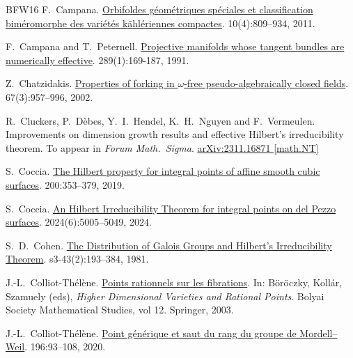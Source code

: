 \documentclass[10pt,a4paper]{amsart}
\theoremstyle{plain}
\theoremstyle{remark}
\numberwithin{theorem}{section}
\begin{document}
\begin{thebibliography}{BFW16}
F.~Campana.
\newblock \href{https://doi.org/10.1017/S1474748010000101}{Orbifoldes g{\'e}om{\'e}triques sp{\'e}ciales et classification bim{\'e}romorphe des vari{\'e}t{\'e}s k{\"a}hl{\'e}riennes compactes}.
 10(4):809--934, 2011.  

F.~Campana and T.~Peternell.
\newblock \href{https://doi.org/10.1007/BF01446566}{Projective manifolds whose tangent bundles are numerically effective}.
 289(1):169-187, 1991.

Z.~Chatzidakis.
\newblock \href{https://www.jstor.org/stable/3648550}{Properties of forking in $\omega$-free pseudo-algebraically closed fields}.
 67(3):957--996, 2002.

R.~Cluckers, P.~D\`ebes, Y.~I.~Hendel, K.~H.~Nguyen and F.~Vermeulen.
\newblock Improvements on dimension growth results and effective Hilbert's irreducibility theorem.
\newblock To appear in {\em Forum Math.\ Sigma}.
\newblock \href{https://doi.org/10.48550/arXiv.2311.16871}{arXiv:2311.16871 [math.NT]}

S.~Coccia.
\newblock \href{https://doi.org/10.1016/j.jnt.2018.11.024}{The Hilbert property for integral points of affine smooth cubic surfaces}. 
 200:353--379, 2019.

S.~Coccia.
\newblock \href{https://doi.org/10.1093/imrn/rnad189}{An Hilbert Irreducibility Theorem for integral points on del Pezzo surfaces}.
 2024(6):5005--5049, 2024.

S.~D.~Cohen.
\newblock \href{https://doi.org/10.1112/plms/s3-43.2.227}{The Distribution of Galois Groups and Hilbert's Irreducibility Theorem}.
 s3-43(2):193--384, 1981.

J.-L.~Colliot-Th\'el\`ene.
\newblock \href{https://doi.org/10.1007/978-3-662-05123-8_7}{Points rationnels sur les fibrations}.
In: Böröczky, Koll\'ar, Szamuely (eds), {\em Higher Dimensional Varieties and Rational Points}. Bolyai Society Mathematical Studies, vol 12. Springer, 2003.

J.-L.~Colliot-Th\'el\`ene.
\newblock \href{https://doi.org/10.4064/aa190814-18-3}{Point g\'en\'erique et saut du rang du groupe de Mordell–Weil}.
 196:93--108, 2020.


\end{thebibliography}
\end{document}
